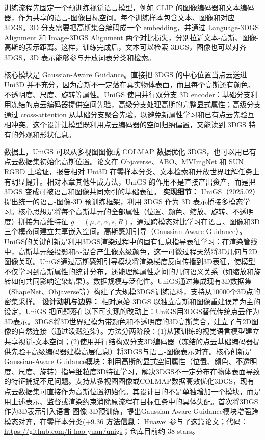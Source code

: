 训练流程先固定一个预训练视觉语言模型，例如 CLIP 的图像编码器和文本编码器，作为共享的语言-图像目标空间。每个训练样本包含文本、图像和对应 3DGS。3D 分支需要把高斯集合编码成一个 embedding，并通过 Language-3DGS Alignment 和 Image-3DGS Alignment 两个对比损失，分别拉近文本-高斯、图像-高斯的表示距离。这样，训练完成后，文本可以检索 3DGS，图像也可以对齐 3DGS，3D 表示能够参与开放词表分类和检索。

核心模块是 Gaussian-Aware Guidance。直接把 3DGS 的中心位置当点云送进 Uni3D 并不充分，因为高斯不一定落在真实物体表面，而且每个高斯还有颜色、不透明度、尺度、旋转等属性。UniGS 使用并行双分支 3D encoder：基础分支利用冻结的点云编码器提供空间先验，高级分支处理高斯的完整显式属性；高级分支通过 cross-attention 从基础分支聚合先验，以避免新属性学习和已有点云先验互相冲突。这个设计让模型既利用点云编码器的空间归纳偏置，又能读到 3DGS 特有的外观和形状信息。

数据上，UniGS 可以从多视图图像或 COLMAP 数据优化 3DGS，也可以用已有点云数据集初始化高斯位置。论文在 Objaverse、ABO、MVImgNet 和 SUN RGBD 上验证，报告相对 Uni3D 在零样本分类、文本检索和开放世界理解任务上有明显提升。相对本章其他生成方法，UniGS 的作用不是直接产出资产，而是把 3DGS 变成可被语言和图像共同索引的基础表征。
\textbf{实现细节：} UniGS（2025.02） 提出统一的语言-图像-3D 预训练框架，利用 3DGS 作为 3D 表示桥接多模态学习。核心思想是将每个高斯基元的全部属性（位置、颜色、缩放、旋转、不透明度）拼接为高维特征 $g = (\mu, c, \alpha, s, R)$，通过跨模态对比学习在语言、图像和3D三个模态间建立共享嵌入空间。高斯感知引导（Gaussian-Aware Guidance）。UniGS的关键创新是利用3DGS渲染过程中的固有信息指导表征学习：在渲染管线中，高斯基元经投影和$\alpha$-混合产生像素级颜色，这一可微过程天然将3D几何与2D图像关联。UniGS通过高斯感知引导模块将渲染梯度反向传播到3D表征，使模型不仅学习到高斯属性的统计分布，还能理解属性之间的几何语义关系（如缩放和旋转如何共同影响渲染结果）。数据规模与泛化性。UniGS通过集成现有3D数据集（ShapeNet、Objaverse等）构建了大规模3DGS训练语料，支持从10000个3D点的密集采样。
\textbf{设计动机与边界：} 相对原始 3DGS 以独立高斯和图像重建误差为主的设定，UniGS 把问题落在以下可实现的改动上：UniGS用3DGS替代传统点云作为3D表示。3DGS将3D世界建模为带颜色和不透明度的3D高斯集合，建立了与2D图像的自然连接（通过泼溅渲染）。方法分两阶段：(1)从预训练的视觉语言模型建立共享视觉-文本空间；(2)使用并行结构双分支3D编码器（冻结的点云基础编码器提供先验+高级编码器建模高层信息）将3DGS与语言-图像表示对齐。核心创新是Gaussian-Aware Guidance模块：利用高斯的显式空间属性（位置、颜色、不透明度、尺度、旋转）指导细粒度3D特征学习，解决3DGS不一定分布在物体表面导致的特征捕捉不足问题。支持从多视图图像或COLMAP数据高效优化3DGS，现有点云数据集可直接作为高斯位置初始化。其设计目的不是单独增加一个模块，而是用上述表示、监督或渲染约束消除原流程在目标任务中的具体失配。首次将3DGS作为3D表示引入语言-图像-3D预训练，提出Gaussian-Aware Guidance模块增强跨模态对齐，在零样本分类(+9.36%
\textbf{方法信息：} Huawei 参与了这篇论文；代码：\url{https://github.com/li-hao-yuan/unigs}；仓库目前约 38 stars。
